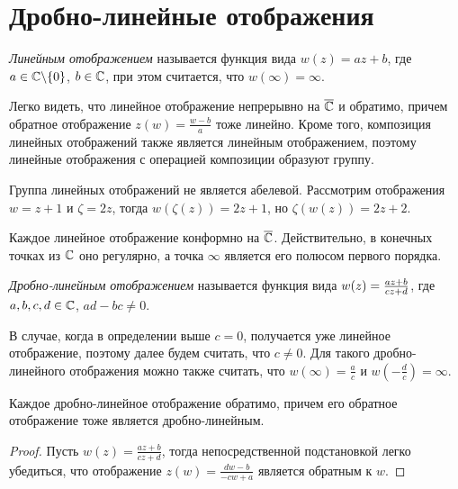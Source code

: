 \section{Дробно-линейные отображения}

\begin{definition}
	\textit{Линейным отображением} называется функция вида $w(z) = az + b$, где $a \in \mathbb{C} \backslash \{0\}$, $b \in \mathbb{C}$, при этом считается, что $w(\infty) = \infty$.
\end{definition}

\begin{note}
	Легко видеть, что линейное отображение непрерывно на $\overline{\mathbb{C}}$ и обратимо, причем обратное отображение $z(w) = \frac{w - b}{a}$ тоже линейно. Кроме того, композиция линейных отображений также является линейным отображением, поэтому линейные отображения с операцией композиции образуют группу.
\end{note}

\begin{example}
	Группа линейных отображений не является абелевой. Рассмотрим отображения $w = z + 1$ и $\zeta = 2z$, тогда $w(\zeta(z)) = 2z + 1$, но $\zeta(w(z)) = 2z + 2$.
\end{example}

\begin{note}
	Каждое линейное отображение конформно на $\overline{\mathbb{C}}$. Действительно, в конечных точках из $\mathbb{C}$ оно регулярно, а точка $\infty$ является его полюсом первого порядка.
\end{note}

\begin{definition}
	\textit{Дробно-линейным отображением} называется функция вида $w(z) \hm= \frac{az + b}{cz + d}$, где $a, b, c, d \in \mathbb{C}$, $ad - bc \ne 0$.
\end{definition}

\begin{note}
	В случае, когда в определении выше $c = 0$, получается уже линейное отображение, поэтому далее будем считать, что $c \ne 0$. Для такого дробно-линейного отображения можно также считать, что $w(\infty) = \frac ac$ и $w(-\frac dc) = \infty$.
\end{note}

\begin{proposition}
	Каждое дробно-линейное отображение обратимо, причем его обратное отображение тоже является дробно-линейным.
\end{proposition}

\begin{proof}
	Пусть $w(z) = \frac{az + b}{cz + d}$, тогда непосредственной подстановкой легко убедиться, что отображение $z(w) = \frac{dw - b}{-cw + a}$ является обратным к $w$.
\end{proof}

